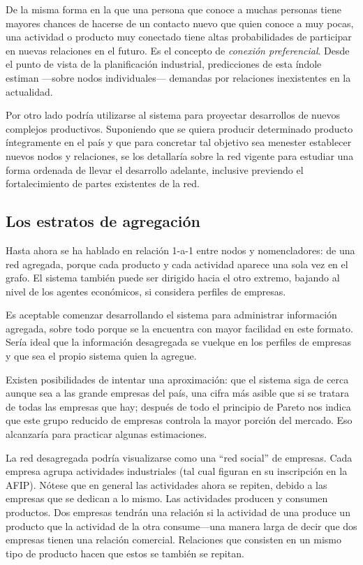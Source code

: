 \documentclass[a4paper]{report}
\begin{document}
De la misma forma en la que una persona que conoce a muchas personas tiene mayores chances de hacerse de un contacto nuevo que quien conoce a muy pocas, una actividad o producto muy conectado tiene altas probabilidades de participar en nuevas relaciones en el futuro. Es el concepto de \textit{conexión preferencial}. Desde el punto de vista de la planificación industrial, predicciones de esta índole estiman —sobre nodos individuales— demandas por relaciones inexistentes en la actualidad.

Por otro lado podría utilizarse al sistema para proyectar desarrollos de nuevos complejos productivos. Suponiendo que se quiera producir determinado producto íntegramente en el país y que para concretar tal objetivo sea menester establecer nuevos nodos y relaciones, se los detallaría sobre la red vigente para estudiar una forma ordenada de llevar el desarrollo adelante, inclusive previendo el fortalecimiento de partes existentes de la red.

\subsection*{Los estratos de agregación}

Hasta ahora se ha hablado en relación 1-a-1 entre nodos y nomencladores: de una red agregada, porque cada producto y cada actividad aparece una sola vez en el grafo. El sistema también puede ser dirigido hacia el otro extremo, bajando al nivel de los agentes económicos, si considera perfiles de empresas.

Es aceptable comenzar desarrollando el sistema para administrar información agregada, sobre todo porque se la encuentra con mayor facilidad en este formato. Sería ideal que la información desagregada se vuelque en los perfiles de empresas y que sea el propio sistema quien la agregue.

Existen posibilidades de intentar una aproximación: que el sistema siga de cerca aunque sea a las grande empresas del país, una cifra más asible que si se tratara de todas las empresas que hay; después de todo el principio de Pareto nos indica que este grupo reducido de empresas controla la mayor porción del mercado. Eso alcanzaría para practicar algunas estimaciones.

La red desagregada podría visualizarse como una ``red social'' de empresas. Cada empresa agrupa actividades industriales (tal cual figuran en su inscripción en la AFIP). Nótese que en general las actividades ahora se repiten, debido a las empresas que se dedican a lo mismo. Las actividades producen y consumen productos. Dos empresas tendrán una relación si la actividad de una produce un producto que la actividad de la otra consume—una manera larga de decir que dos empresas tienen una relación comercial. Relaciones que consisten en un mismo tipo de producto hacen que estos se también se repitan.
\end{document}
